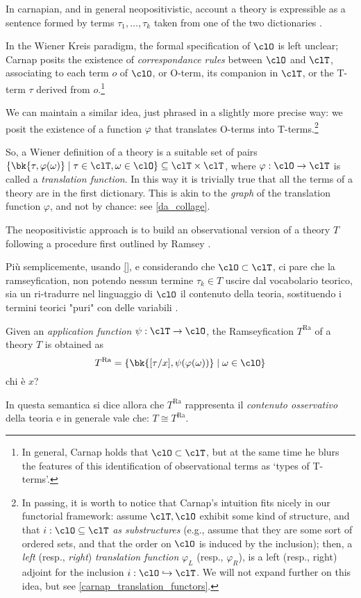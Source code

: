 In carnapian, and in general neopositivistic, account a theory is expressible as a sentence formed by terms $\tau_1, \dots, \tau_k$ taken from one of the two dictionaries \cite{?}. 

In the Wiener Kreis paradigm, the formal specification of $\clO$ is left unclear; Carnap \cite{} posits the existence of \emph{correspondance rules} between $\clO$ and $\clT$, associating to each term $o$ of $\clO$, or O-term, its companion in $\clT$, or the T-term $\tau$ derived from $o$.\footnote{In general, Carnap holds that $\clO \subset \clT$, but at the same time he blurs the features of this identification of observational terms as `types of T-terms'.}

We can maintain a similar idea, just phrased in a slightly more precise way: we posit the existence of a function $\varphi$ that translates O-terms into T-terms.\footnote{In passing, it is worth to notice that Carnap's intuition fits nicely in our functorial framework: assume $\clT, \clO$ exhibit some kind of structure, and that $i : \clO\subseteq\clT$ \emph{as substructures} (e.g., assume that they are some sort of ordered sets, and that the order on $\clO$ is induced by the inclusion); then, a \emph{left} (resp., \emph{right}) \emph{translation function} $\varphi_L$ (resp., $\varphi_R$), is a left (resp., right) adjoint for the inclusion $i : \clO\hookrightarrow \clT$. We will not expand further on this idea, but see \autoref{carnap_translation_functors}.}

So, a Wiener definition of a theory is a suitable set of pairs $\{\bk{\tau,\varphi(\omega)} \mid \tau\in\clT, \omega \in\clO\}\subseteq \clT\times\clT$, where $\varphi: \clO \to \clT$ is called a \emph{translation function}. In this way it is trivially true that all the terms of a theory are in the first dictionary. This is akin to the \emph{graph} of the translation function $\varphi$, and not by chance: see \autoref{da_collage}.

The neopositivistic approach is to build an observational version of a theory $T$ following a procedure first outlined by Ramsey \cite{?}.

Più semplicemente, usando \autoref{}, e considerando che $\clO \subset \clT$, ci pare che la ramseyfication, non potendo nessun termine $\tau_k \in T$ uscire dal vocabolario teorico, sia un ri-tradurre nel linguaggio di $\clO$ il contenuto della teoria, sostituendo i termini teorici "puri" con delle variabili \cite{?}.
\begin{definition}
	Given an \emph{application function} $\psi: \clT \to \clO$, the Ramseyfication $T^\text{Ra}$ of a theory $T$ is obtained as  
	\[ 
		T^\text{Ra} = \{\bk{[\tau/x], \psi(\varphi (\omega))} \mid \omega\in\clO\} 
	\] {\color{red} chi è $x$?}
\end{definition}
In questa semantica si dice allora che $T^\text{Ra}$ rappresenta il \emph{contenuto osservativo} della teoria e in generale vale che: $T \cong T^\text{Ra}$. 



